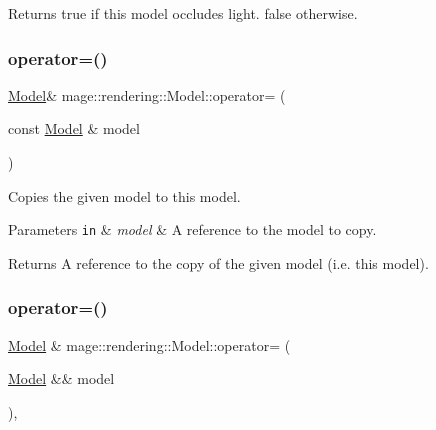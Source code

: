\begin{DoxyReturn}{Returns}
{\ttfamily true} if this model occludes light. {\ttfamily false} otherwise. 
\end{DoxyReturn}
\hypertarget{classmage_1_1rendering_1_1_model_aa7edda6386fa2ae0638e5c46dccff016}{}\label{classmage_1_1rendering_1_1_model_aa7edda6386fa2ae0638e5c46dccff016} 
\subsubsection{\texorpdfstring{operator=()}{operator=()}\hspace{0.1cm}{\footnotesize\ttfamily [1/2]}}
{\footnotesize\ttfamily \hyperlink{classmage_1_1rendering_1_1_model}{Model}\& mage\+::rendering\+::\+Model\+::operator= (\begin{DoxyParamCaption}\item[{const \hyperlink{classmage_1_1rendering_1_1_model}{Model} \&}]{model }\end{DoxyParamCaption})\hspace{0.3cm}{\ttfamily [delete]}}

Copies the given model to this model.


\begin{DoxyParams}[1]{Parameters}
\mbox{\tt in}  & {\em model} & A reference to the model to copy. \\
\hline
\end{DoxyParams}
\begin{DoxyReturn}{Returns}
A reference to the copy of the given model (i.\+e. this model). 
\end{DoxyReturn}
\hypertarget{classmage_1_1rendering_1_1_model_a2b374cb908e39da8ff35ea5c17ce640d}{}\label{classmage_1_1rendering_1_1_model_a2b374cb908e39da8ff35ea5c17ce640d} 
\subsubsection{\texorpdfstring{operator=()}{operator=()}\hspace{0.1cm}{\footnotesize\ttfamily [2/2]}}
{\footnotesize\ttfamily \hyperlink{classmage_1_1rendering_1_1_model}{Model} \& mage\+::rendering\+::\+Model\+::operator= (\begin{DoxyParamCaption}\item[{\hyperlink{classmage_1_1rendering_1_1_model}{Model} \&\&}]{model }\end{DoxyParamCaption})\hspace{0.3cm}{\ttfamily [default]}, {\ttfamily [noexcept]}}

